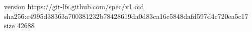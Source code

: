 version https://git-lfs.github.com/spec/v1
oid sha256:e4995d38363a700381232b78428619da0d83ca16c5848dafd597d4c720ea5c17
size 42688

